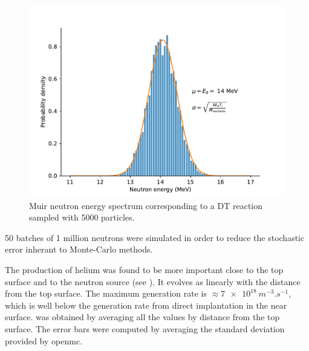 \begin{figure}
    \includegraphics[width=\linewidth]{Figures/Chapter5/DT_neutron_source.pdf}
    \caption{Muir neutron energy spectrum corresponding to a DT reaction sampled with 5000 particles.}
\end{figure}

50 batches of 1 million neutrons were simulated in order to reduce the stochastic error inherant to Monte-Carlo methods.

The production of helium was found to be more important close to the top surface and to the neutron source (see ).
It evolves as linearly with the distance from the top surface.
The maximum generation rate is $\approx \SI{7e18}{m^{-3}.s^{-1}}$, which is well below the generation rate from direct implantation in the near surface.
 was obtained by averaging all the values by distance from the top surface.
The error bars were computed by averaging the standard deviation provided by \gls{openmc}.


